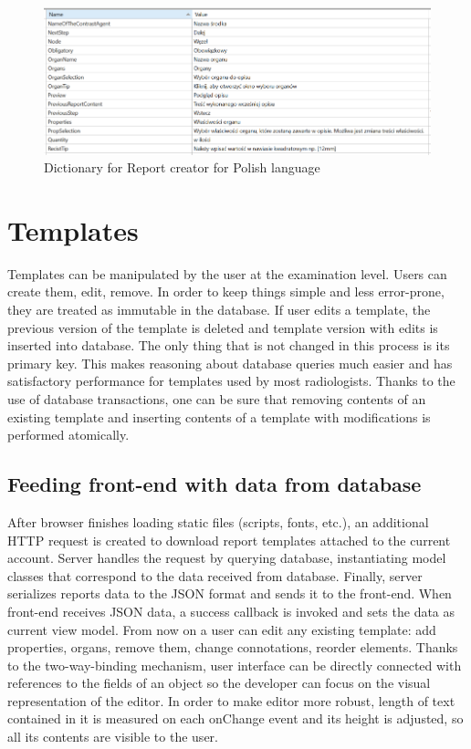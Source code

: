 \documentclass[12pt, twoside, openany]{report}
\theoremstyle{definition}
\begin{document}
\begin{figure}
    \centering
    \includegraphics[width=1\linewidth]{language-dictionary}
    \caption{Dictionary for Report creator for Polish language\label{fig:language-dictionary}}
\end{figure}
\section{Templates}
Templates can be manipulated by the user at the examination level. Users can create them, edit, remove. In order to keep things simple and less error-prone, they are treated as immutable in the database. If user edits a template, the previous version of the template is deleted and template version with edits is inserted into database. The only thing that is not changed in this process is its primary key. This makes reasoning about database queries much easier and has satisfactory performance for templates used by most radiologists. Thanks to the use of database transactions, one can be sure that removing contents of an existing template and inserting contents of a template with modifications is performed atomically.

\subsection{Feeding front-end with data from database}\label{templates-immutable}
After browser finishes loading static files (scripts, fonts, etc.), an additional HTTP request is created to download report templates attached to the current account. Server handles the request by querying database, instantiating model classes that correspond to the data received from database. Finally, server serializes reports data to the JSON format and sends it to the front-end. When front-end receives JSON data, a success callback is invoked and sets the data as current view model. 
From now on a user can edit any existing template: add properties, organs, remove them, change connotations, reorder elements. Thanks to the two-way-binding mechanism, user interface can be directly connected with references to the fields of an object so the developer can focus on the visual representation of the editor. In order to make editor more robust, length of text contained in it is measured on each onChange event and its height is adjusted, so all its contents are visible to the user.
\end{document}
